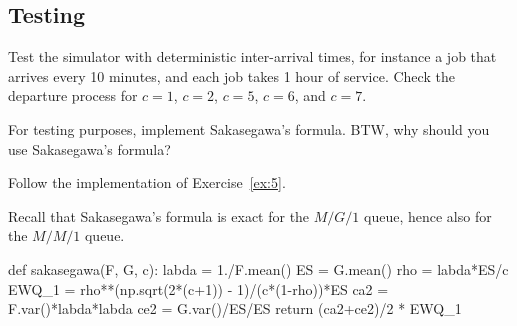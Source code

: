 \subsection{Testing}
\label{sec:testing-1}

\begin{exercise}
Test the simulator with deterministic inter-arrival times, for instance a job that arrives every 10 minutes, and each job takes 1 hour of service. Check the departure process for $c=1$, $c=2$, $c=5$, $c=6$, and $c=7$. 
\end{exercise}

\begin{exercise}
  For testing purposes, implement Sakasegawa's formula.  BTW, why should you use Sakasegawa's formula?

\begin{hint}
Follow the implementation of Exercise~\ref{ex:5}. 

  \end{hint}

  \begin{solution}
Recall that Sakasegawa's formula is exact for the $M/G/1$ queue, hence also for the $M/M/1$ queue. 

\begin{pyverbatim}

def sakasegawa(F, G, c):
    labda = 1./F.mean()
    ES = G.mean()
    rho = labda*ES/c
    EWQ_1 = rho**(np.sqrt(2*(c+1)) - 1)/(c*(1-rho))*ES
    ca2 = F.var()*labda*labda
    ce2 = G.var()/ES/ES
    return (ca2+ce2)/2 * EWQ_1
    
  \end{pyverbatim}
    
    
  \end{solution}
\end{exercise}



